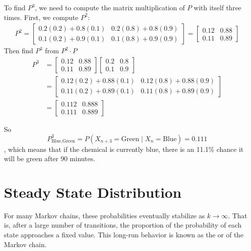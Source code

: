 \begin{Answer}[ref={ex:markov_3}]

    To find $P^3$, we need to compute the matrix multiplication of $P$ with itself three times. First, we compute $P^2$:
    $$\begin{array}{c} P^2=
            \begin{bmatrix}
                0.2(0.2)+0.8(0.1) & 0.2(0.8)+0.8(0.9) \\
                0.1(0.2)+0.9(0.1) & 0.1(0.8)+0.9(0.9)
            \end{bmatrix}
            =
            \begin{bmatrix}
                0.12 & 0.88 \\
                0.11 & 0.89
            \end{bmatrix}\end{array}$$
    Then find $P^3$ from $P^2\cdot P$
    \begin{align*}
        P^3 & = \begin{bmatrix}
                    0.12 & 0.88 \\
                    0.11 & 0.89
                \end{bmatrix}
        \begin{bmatrix}
            0.2 & 0.8 \\
            0.1 & 0.9
        \end{bmatrix}                                    \\
            & = \begin{bmatrix}
                    0.12(0.2)+0.88(0.1) & 0.12(0.8)+0.88(0.9) \\
                    0.11(0.2)+0.89(0.1) & 0.11(0.8)+0.89(0.9)
                \end{bmatrix} \\
            & = \begin{bmatrix}
                    0.112 & 0.888 \\
                    0.111 & 0.889
                \end{bmatrix}
    \end{align*}

    So $$P^3_{\text{Blue},\text{Green}} = P(X_{n+3}=\text{Green}\mid X_n=\text{Blue})=0.111$$, which means that if the chemical is currently blue, there is an 11.1\% chance it will be green after 90 minutes.
\end{Answer}
\section{Steady State Distribution}
For many Markov chains, these probabilities eventually stabilize as $k \rightarrow \infty$. That is, after a large number of transitions, the proportion of the probability of each state approaches a fixed value. This long-run behavior is known as the  or  of the Markov chain.

